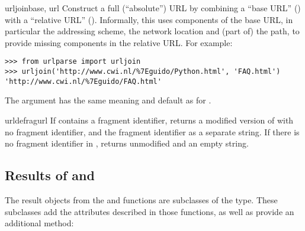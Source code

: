 \begin{funcdesc}{urljoin}{base, url}
Construct a full (``absolute'') URL by combining a ``base URL''
() with a ``relative URL'' ().  Informally, this
uses components of the base URL, in particular the addressing scheme,
the network location and (part of) the path, to provide missing
components in the relative URL.  For example:

\begin{verbatim}
>>> from urlparse import urljoin
>>> urljoin('http://www.cwi.nl/%7Eguido/Python.html', 'FAQ.html')
'http://www.cwi.nl/%7Eguido/FAQ.html'
\end{verbatim}

The  argument has the same meaning and default as
for .
\end{funcdesc}

\begin{funcdesc}{urldefrag}{url}
If  contains a fragment identifier, returns a modified
version of  with no fragment identifier, and the fragment
identifier as a separate string.  If there is no fragment identifier
in , returns  unmodified and an empty string.
\end{funcdesc}


\begin{seealso}
\end{seealso}


\subsection{Results of  and 
            \label{urlparse-result-object}}

The result objects from the  and
 functions are subclasses of the 
type.  These subclasses add the attributes described in those
functions, as well as provide an additional method:

